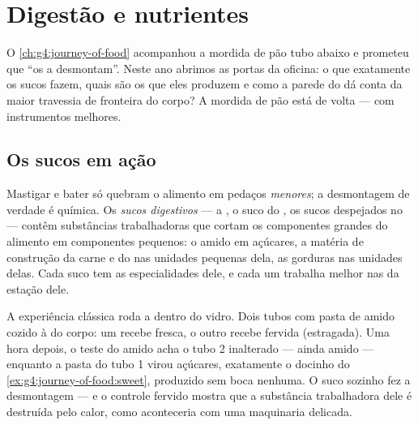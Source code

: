 \chapter{Digestão e nutrientes}\label{ch:g7:digestion-and-nutrients}

O \cref{ch:g4:journey-of-food} acompanhou a mordida de pão tubo abaixo
e prometeu que ``os  a desmontam''. Neste ano abrimos
as portas da oficina: o que exatamente os sucos fazem, quais são os
 que eles produzem e como a parede do  dá
conta da maior travessia de fronteira do corpo? A mordida de pão está
de volta --- com instrumentos melhores.

\section{Os sucos em ação}

\begin{proposition}\label{prop:g7:digestion-and-nutrients:chemical}
Mastigar e bater só quebram o alimento em pedaços \emph{menores}; a
desmontagem de verdade é química. Os \emph{sucos
digestivos} --- a , o suco do , os
sucos despejados no  --- contêm substâncias
trabalhadoras que cortam os componentes grandes do alimento em
componentes pequenos: o amido em açúcares, a matéria de construção da
carne e do  nas unidades pequenas dela, as gorduras nas unidades
delas. Cada suco tem as especialidades dele, e cada um trabalha melhor
nas  da estação dele.
\end{proposition}
\admitted

\begin{example}\label{ex:g7:digestion-and-nutrients:bench}
A experiência clássica roda a  dentro do vidro. Dois tubos com
pasta de amido cozido à  do corpo: um recebe  fresca,
o outro recebe  fervida (estragada). Uma hora depois, o teste do
amido acha o tubo 2 inalterado --- ainda amido --- enquanto a pasta do
tubo 1 virou açúcares, exatamente o docinho do
\cref{ex:g4:journey-of-food:sweet}, produzido sem boca nenhuma. O suco
sozinho fez a desmontagem --- e o controle fervido mostra que a
substância trabalhadora dele é destruída pelo calor, como aconteceria
com uma maquinaria delicada.
\end{example}

